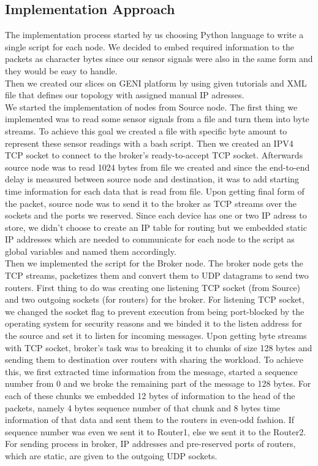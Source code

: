 \documentclass[conference]{IEEEtran}
\begin{document}
\subsection{Implementation Approach}
The implementation process started by us choosing Python language to write a single script for each node. We decided to embed required information to the packets as character bytes since our sensor signals were also in the same form and they would be easy to handle. \\

Then we created our slices on GENI platform by using given tutorials and XML file that defines our topology with assigned manual IP adresses. \\

We started the implementation of nodes from Source node. The first thing we implemented was to read some sensor signals from a file and turn them into byte streams. To achieve this goal we created a file with specific byte amount to represent these sensor readings with a bash script. Then we created an IPV4 TCP socket to connect to the broker's ready-to-accept TCP socket. Afterwards source node was to read 1024 bytes from file we created and since the end-to-end delay is measured between source node and destination, it was to add starting time information for each data that is read from file. Upon getting final form of the packet, source node was to send it to the broker as TCP streams over the sockets and the ports we reserved. Since each device has one or two IP adress to store, we didn't choose to create an IP table for routing but we embedded static IP addresses which are needed to communicate for each node to the script as global variables and named them accordingly. \\

Then we implemented the script for the Broker node. The broker node gets the TCP streams, packetizes them and convert them to UDP datagrams to send two routers. First thing to do was creating one listening TCP socket (from Source) and two outgoing sockets (for routers) for the broker. For listening TCP socket, we changed the socket flag to prevent execution from being port-blocked by the operating system for security reasons and we binded it to the listen address for the source and set it to listen for incoming messages. Upon getting byte streams with TCP socket, broker's task was to breaking it to chunks of size 128 bytes and sending them to destination over routers with sharing the workload. To achieve this, we first extracted time information from the message, started a sequence number from 0 and we broke the remaining part of the message to 128 bytes. For each of these chunks we embedded 12 bytes of information to the head of the packets, namely 4 bytes sequence number of that chunk and 8 bytes time information of that data and sent them to the routers in even-odd fashion. If sequence number was even we sent it to Router1, else we sent it to the Router2. For sending process in broker, IP addresses and pre-reserved ports of routers, which are static, are given to the outgoing UDP sockets. \\
\end{document}
